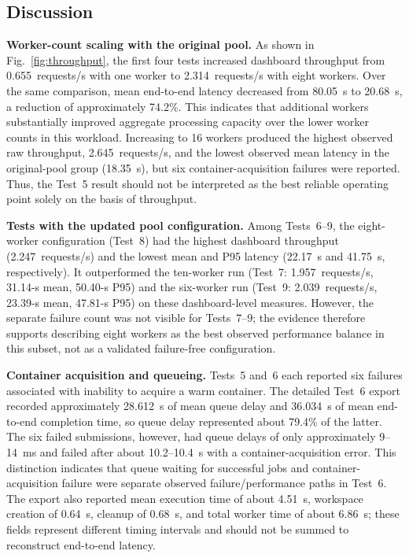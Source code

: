 \subsection{Discussion}
\textbf{Worker-count scaling with the original pool.} As shown in Fig.~\ref{fig:throughput}, the first four tests increased dashboard throughput from 0.655~requests/s with one worker to 2.314~requests/s with eight workers. Over the same comparison, mean end-to-end latency decreased from 80.05~s to 20.68~s, a reduction of approximately 74.2\%. This indicates that additional workers substantially improved aggregate processing capacity over the lower worker counts in this workload. Increasing to 16 workers produced the highest observed raw throughput, 2.645~requests/s, and the lowest observed mean latency in the original-pool group (18.35~s), but six container-acquisition failures were reported. Thus, the Test~5 result should not be interpreted as the best reliable operating point solely on the basis of throughput.

\textbf{Tests with the updated pool configuration.} Among Tests~6--9, the eight-worker configuration (Test~8) had the highest dashboard throughput (2.247~requests/s) and the lowest mean and P95 latency (22.17~s and 41.75~s, respectively). It outperformed the ten-worker run (Test~7: 1.957~requests/s, 31.14-s mean, 50.40-s P95) and the six-worker run (Test~9: 2.039~requests/s, 23.39-s mean, 47.81-s P95) on these dashboard-level measures. However, the separate failure count was not visible for Tests~7--9; the evidence therefore supports describing eight workers as the best observed performance balance in this subset, not as a validated failure-free configuration.

\textbf{Container acquisition and queueing.} Tests~5 and~6 each reported six failures associated with inability to acquire a warm container. The detailed Test~6 export recorded approximately 28.612~s of mean queue delay and 36.034~s of mean end-to-end completion time, so queue delay represented about 79.4\% of the latter. The six failed submissions, however, had queue delays of only approximately 9--14~ms and failed after about 10.2--10.4~s with a container-acquisition error. This distinction indicates that queue waiting for successful jobs and container-acquisition failure were separate observed failure/performance paths in Test~6. The export also reported mean execution time of about 4.51~s, workspace creation of 0.64~s, cleanup of 0.68~s, and total worker time of about 6.86~s; these fields represent different timing intervals and should not be summed to reconstruct end-to-end latency.

